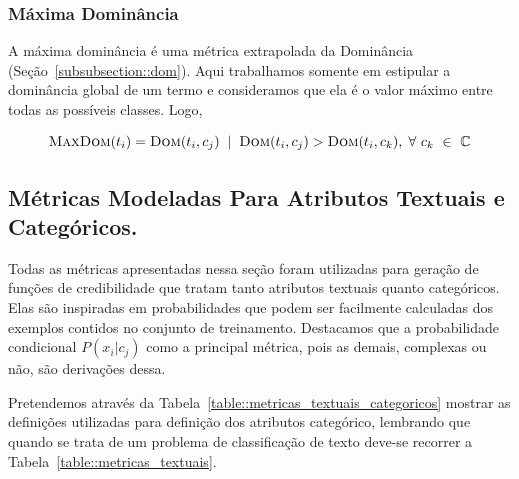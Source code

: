 
\subsubsection{Máxima Dominância}
\label{subsubsection::maxdom}
A máxima dominância é uma métrica extrapolada da Dominância (Seção~\ref{subsubsection::dom}). Aqui trabalhamos somente em estipular a dominância global de um termo e consideramos que ela é o valor máximo entre todas as possíveis classes. Logo,

\begin{equation}\label{eqn::maxdom}
 \textsc{MaxDom}(t_i) = \textsc{Dom}(t_i,c_j) \; \; | \;\; \textsc{Dom}(t_i, c_j) > \textsc{Dom}(t_i, c_k), \; \forall\ c_k\ \in\ \mathbb{C}
\end{equation}

%

\subsection{Métricas Modeladas Para Atributos Textuais e Categóricos.}
\label{subsec::pg_metricas_conteudo}


Todas as métricas apresentadas nessa seção foram utilizadas para geração de funções de credibilidade que tratam tanto atributos textuais quanto categóricos. 
Elas são inspiradas em probabilidades que podem ser facilmente calculadas dos exemplos contidos no conjunto de treinamento. 
Destacamos que a probabilidade condicional $P(x_i|c_j)$ como a principal métrica, pois as demais, complexas ou não, são derivações dessa.

Pretendemos através da Tabela~\ref{table::metricas_textuais_categoricos} mostrar as definições utilizadas para definição dos atributos categórico, lembrando que quando se trata de um problema de classificação de texto deve-se recorrer a Tabela~\ref{table::metricas_textuais}.


